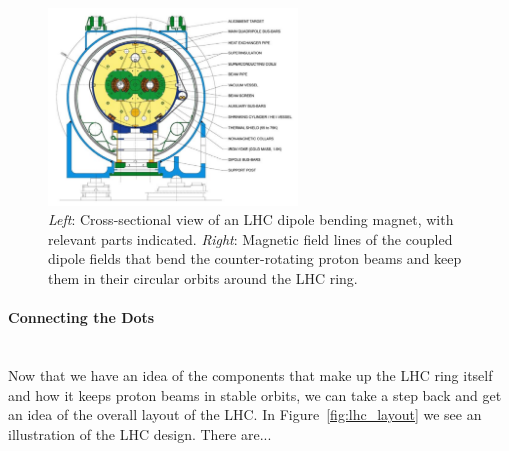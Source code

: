 \begin{figure}[!htb]
    \begin{center}
        \begin{minipage}{\textwidth}
        \includegraphics[width=0.59\textwidth]{figures/chapter2/lhc_dipole_fig3p3}
        \end{minipage}
        \caption{
            \textit{Left}: Cross-sectional view of an LHC dipole bending magnet, with relevant parts indicated.
            \textit{Right}: Magnetic field lines of the coupled dipole fields that bend the counter-rotating proton beams
            and keep them in their circular orbits around the LHC ring.
        }
        \label{fig:lhc_dipole_xsec}
    \end{center}
\end{figure}

\paragraph{Connecting the Dots} \mbox{} \\

Now that we have an idea of the components that make up the LHC ring itself and how it keeps proton beams in stable
orbits, we can take a step back and get an idea of the overall layout of the LHC.
In Figure~\ref{fig:lhc_layout} we see an illustration of the LHC design.
There are...

